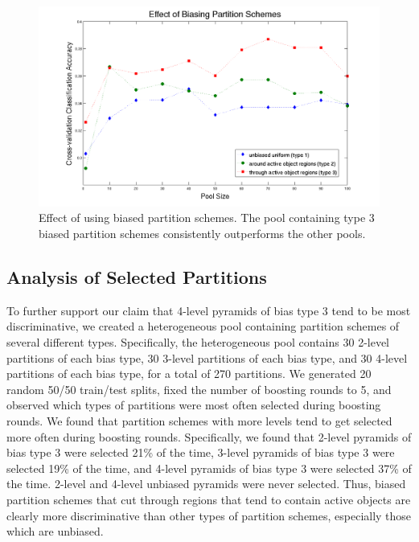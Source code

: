 \documentclass{bmvc2k}
\begin{document}
  \begin{figure}[t]
		\begin{center}
			  \includegraphics[width=1.0\linewidth]{figures/biaseffect.png}
		\end{center}
		   \caption{Effect of using biased partition schemes. The pool
       containing type 3 biased partition schemes consistently outperforms
     the other pools.}
				\label{fig:long}
				\label{fig:onecol}
	\end{figure}
  
  \subsection{Analysis of Selected Partitions}
  To further support our claim that 4-level pyramids of bias type 3 tend to be most
  discriminative, we created a heterogeneous pool containing partition
  schemes of
  several different types. Specifically, the heterogeneous pool contains 30 2-level
  partitions of each bias type, 30 3-level partitions of each bias type, and
  30 4-level partitions of each bias type, for a total of 270 partitions.
  We generated 20 random 50/50 train/test splits, fixed the number of
  boosting rounds to 5, and observed which types of partitions were most
  often selected during boosting rounds.
  We found that partition schemes with more levels tend to get selected more
  often during boosting rounds.
  Specifically, we found that 2-level pyramids of bias type 3 were selected
  21\% of the time, 3-level pyramids of bias type 3 were selected 19\% of
  the time, and 4-level pyramids of bias type 3 were selected 37\% of the
  time. 2-level and 4-level unbiased pyramids were never selected. Thus,
  biased partition schemes that cut through regions that tend to contain
  active objects are clearly more discriminative than other types of
  partition schemes, especially those which are unbiased.
	
\end{document}
